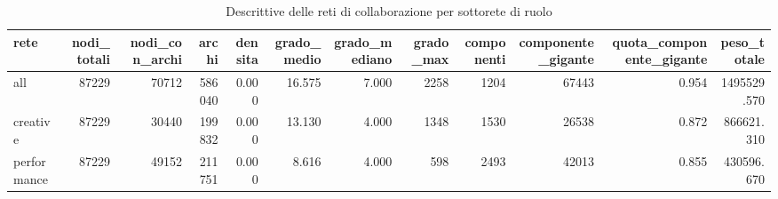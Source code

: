 \begin{table}
\centering
\caption{Descrittive delle reti di collaborazione per sottorete di ruolo}
\label{tab:t2_rete_descrittive}
\begin{tabular}{lrrrrrrrrrrr}
\toprule
       rete &  nodi\_totali &  nodi\_con\_archi &  archi &  densita &  grado\_medio &  grado\_mediano &  grado\_max &  componenti &  componente\_gigante &  quota\_componente\_gigante &  peso\_totale \\
\midrule
        all &        87229 &           70712 & 586040 &    0.000 &       16.575 &          7.000 &       2258 &        1204 &               67443 &                     0.954 &  1495529.570 \\
   creative &        87229 &           30440 & 199832 &    0.000 &       13.130 &          4.000 &       1348 &        1530 &               26538 &                     0.872 &   866621.310 \\
performance &        87229 &           49152 & 211751 &    0.000 &        8.616 &          4.000 &        598 &        2493 &               42013 &                     0.855 &   430596.670 \\
\bottomrule
\end{tabular}
\end{table}
